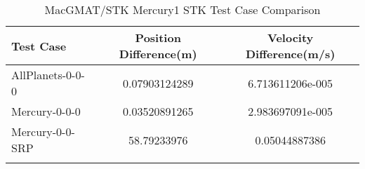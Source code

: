 \begin{table}[htbp!]
\centering
\caption{ MacGMAT/STK Mercury1 STK Test Case Comparison}
      \begin{tabular}{lcc}
      \hline\hline
          Test Case & Position Difference(m) & Velocity Difference(m/s) \\
         \hline
         AllPlanets-0-0-0 & 0.07903124289 & 6.713611206e-005 \\
         Mercury-0-0-0 & 0.03520891265 & 2.983697091e-005 \\
         Mercury-0-0-SRP & 58.79233976 & 0.05044887386 \\
      \hline\hline
      \label{Table: Mercury1 STK Table} 
\end{tabular}
\end{table}
